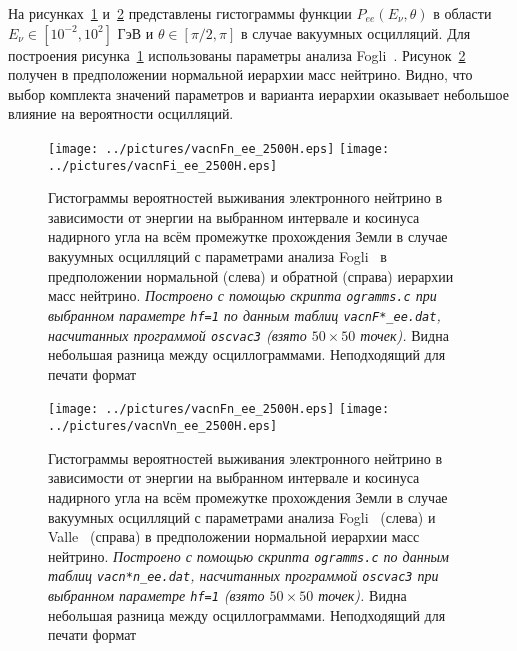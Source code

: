 На рисунках~\ref{vacn3DF} и~\ref{vacn3Dn} представлены гистограммы функции $P_{ee}(E_{\nu},\theta)$ в области $E_{\nu}\in[10^{-2},10^{2}]$ ГэВ и $\theta\in[\pi/2,\pi]$ в случае вакуумных осцилляций. Для построения рисунка~\ref{vacn3DF} использованы параметры анализа Fogli~\cite{Fogli:2012ua}. Рисунок~\ref{vacn3Dn} получен в предположении нормальной иерархии масс нейтрино. Видно, что выбор комплекта значений параметров и варианта иерархии оказывает небольшое влияние на вероятности осцилляций.
\clearpage
\begin{figure}[!ht]
\texttt{[image: ../pictures/vacnFn\_ee\_2500H.eps]}
\texttt{[image: ../pictures/vacnFi\_ee\_2500H.eps]}
\caption{Гистограммы вероятностей выживания электронного нейтрино в зависимости от энергии на выбранном интервале и косинуса надирного угла на всём промежутке прохождения Земли в случае вакуумных осцилляций с параметрами анализа Fogli~\cite{Fogli:2012ua} в предположении нормальной (слева) и обратной (справа) иерархии масс нейтрино. \textit{Построено с помощью скрипта \texttt{ogramms.c} при выбранном параметре \texttt{hf=1} по данным таблиц \texttt{vacnF*\_ee.dat}, насчитанных программой \texttt{oscvac3} (взято $50\times50$ точек).} Видна небольшая разница между осциллограммами. {\color{magenta}Неподходящий для печати формат}}
\label{vacn3DF}
\end{figure}

\begin{figure}[!ht]
\texttt{[image: ../pictures/vacnFn\_ee\_2500H.eps]}
\texttt{[image: ../pictures/vacnVn\_ee\_2500H.eps]}
\caption{Гистограммы вероятностей выживания электронного нейтрино в зависимости от энергии на выбранном интервале и косинуса надирного угла на всём промежутке прохождения Земли в случае вакуумных осцилляций с параметрами анализа Fogli~\cite{Fogli:2012ua} (слева) и Valle~\cite{Tortola:2012te} (справа) в предположении нормальной иерархии масс нейтрино. \textit{Построено с помощью скрипта \texttt{ogramms.c} по данным таблиц \texttt{vacn*n\_ee.dat}, насчитанных программой \texttt{oscvac3} при выбранном параметре \texttt{hf=1} (взято $50\times50$ точек).} Видна небольшая разница между осциллограммами. {\color{magenta}Неподходящий для печати формат}}
\label{vacn3Dn}
\end{figure}


